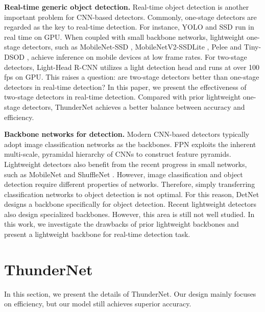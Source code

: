 \documentclass[10pt,twocolumn,letterpaper]{article}
\def\head#1{\noindent\textbf{#1}}
\begin{document}
\head{Real-time generic object detection.}
Real-time object detection is another important problem for CNN-based detectors.
Commonly, one-stage detectors are regarded as the key to real-time detection.
For instance, YOLO \cite{redmon2016you,redmon2017yolo9000,redmon2018yolov3} and SSD \cite{liu2016ssd} run in real time on GPU.
When coupled with small backbone networks, lightweight one-stage detectors, such as MobileNet-SSD \cite{howard2017mobilenets}, MobileNetV2-SSDLite \cite{sandler2018mobilenetv2}, Pelee \cite{wang2018pelee} and Tiny-DSOD \cite{li2018tiny}, achieve inference on mobile devices at low frame rates.
For two-stage detectors, Light-Head R-CNN \cite{li2017light} utilizes a light detection head and runs at over 100 fps on GPU.
This raises a question: are two-stage detectors better than one-stage detectors in real-time detection?
In this paper, we present the effectiveness of two-stage detectors in real-time detection.
Compared with prior lightweight one-stage detectors, ThunderNet achieves a better balance between accuracy and efficiency.


\head{Backbone networks for detection.}
Modern CNN-based detectors typically adopt image classification networks \cite{simonyan2014very,he2016deep,xie2017aggregated,hu2018squeeze} as the backbones.
FPN \cite{lin2017feature} exploits the inherent multi-scale, pyramidal hierarchy of CNNs to construct feature pyramids.
Lightweight detectors also benefit from the recent progress in small networks, such as MobileNet \cite{howard2017mobilenets,sandler2018mobilenetv2} and ShuffleNet \cite{zhang2018shufflenet,ma2018shufflenet}.
However, image classification and object detection require different properties of networks.
Therefore, simply transferring classification networks to object detection is not optimal.
For this reason, DetNet \cite{li2018detnet} designs a backbone specifically for object detection.
Recent lightweight detectors \cite{wang2018pelee,li2018tiny} also design specialized backbones.
However, this area is still not well studied.
In this work, we investigate the drawbacks of prior lightweight backbones and present a lightweight backbone for real-time detection task.


\section{ThunderNet}

In this section, we present the details of ThunderNet.
Our design mainly focuses on efficiency, but our model still achieves superior accuracy.
\end{document}
